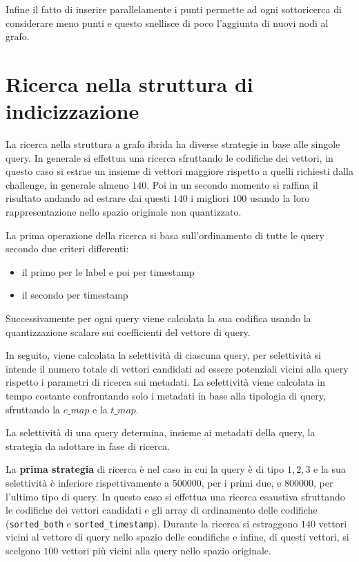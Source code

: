 Infine il fatto di inserire parallelamente i punti permette ad ogni sottoricerca di considerare meno punti e questo snellisce di poco l'aggiunta di nuovi nodi al grafo.

\section{Ricerca nella struttura di indicizzazione}

La ricerca nella struttura a grafo ibrida ha diverse strategie in base alle singole 
query. In generale si effettua una ricerca sfruttando le codifiche dei vettori, 
in questo caso si estrae un insieme di vettori maggiore rispetto a quelli richiesti 
dalla challenge, in generale almeno $140$. Poi in un secondo momento si raffina 
il risultato andando ad estrare dai questi $140$ i migliori $100$ usando la loro 
rappresentazione nello spazio originale non quantizzato. 

La prima operazione della ricerca si basa sull'ordinamento di tutte le query 
secondo due criteri differenti:
\begin{itemize}
    \item il primo per le label e poi per timestamp
    \item il secondo per timestamp
\end{itemize} 
Successivamente per ogni query viene calcolata la sua codifica usando la quantizzazione 
scalare sui coefficienti del vettore di query.

In seguito, viene calcolata la selettività di ciascuna query, per selettività
si intende il numero totale di vettori candidati ad essere potenziali vicini alla 
query rispetto i parametri di ricerca sui metadati. 
La selettività viene calcolata in tempo costante confrontando solo i metadati in 
base alla tipologia di query, sfruttando la $c\_map$ e la $t\_map$. 

La selettività di una query determina, insieme ai metadati della query, la strategia 
da adottare in fase di ricerca.

La \textbf{prima strategia} di ricerca è nel caso in cui la query è di tipo $1,2,3$ 
e la sua selettività è inferiore rispettivamente a $500000$, per i primi due, e $800000$, 
per l'ultimo tipo di query. In questo caso 
si effettua una ricerca esaustiva sfruttando le codifiche dei vettori candidati 
e gli array di ordinamento delle codifiche (\texttt{sorted\_both} e \texttt{sorted\_timestamp}).
Durante la ricerca si estraggono $140$ vettori vicini al vettore di query nello 
spazio delle condifiche e infine, di questi vettori, si scelgono $100$ vettori 
più vicini alla query nello spazio originale. 

